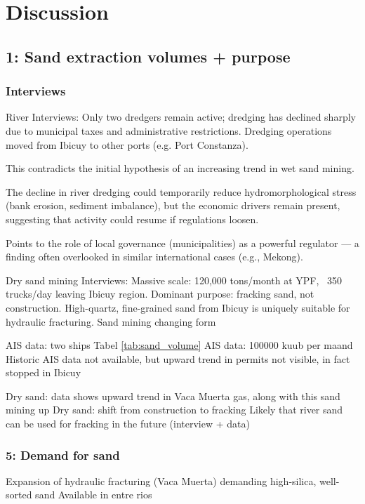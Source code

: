 \chapter{Discussion}

\section{1: Sand extraction volumes + purpose}
\subsection{Interviews}
River
Interviews: Only two dredgers remain active; dredging has declined sharply due to municipal taxes and administrative restrictions. Dredging operations moved from Ibicuy to other ports (e.g. Port Constanza).

This contradicts the initial hypothesis of an increasing trend in wet sand mining.

The decline in river dredging could temporarily reduce hydromorphological stress (bank erosion, sediment imbalance), but the economic drivers remain present, suggesting that activity could resume if regulations loosen.

Points to the role of local governance (municipalities) as a powerful regulator — a finding often overlooked in similar international cases (e.g., Mekong).

Dry sand mining
Interviews: Massive scale: 120,000 tons/month at YPF, ~350 trucks/day leaving Ibicuy region.
Dominant purpose: fracking sand, not construction.
High-quartz, fine-grained sand from Ibicuy is uniquely suitable for hydraulic fracturing.
Sand mining changing form

AIS data: two ships
Tabel \ref{tab:sand_volume} AIS data: 100000 kuub per maand
Historic AIS data not available, but upward trend in permits not visible, in fact stopped in Ibicuy

Dry sand: data shows upward trend in Vaca Muerta gas, along with this sand mining up
Dry sand: shift from construction to fracking
Likely that river sand can be used for fracking in the future (interview + data)

\subsection{5: Demand for sand}
Expansion of hydraulic fracturing (Vaca Muerta) demanding high-silica, well-sorted sand
Available in entre rios

